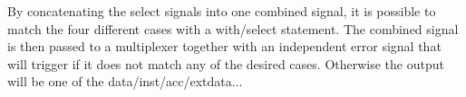 
By concatenating the select signals into one combined signal, it is
possible to match the four different cases with a with/select statement.
The combined signal is then passed to a multiplexer together with an
independent error signal that will trigger if it does not match any of the
desired cases. Otherwise the output will be one of the
data/inst/acc/extdata...